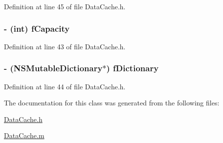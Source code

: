 Definition at line 45 of file DataCache.h.

\hypertarget{interface_data_cache_af27c42bd9600a5c9935ce169048c1f29}{
\subsubsection[{fCapacity}]{\setlength{\rightskip}{0pt plus 5cm}-\/ (int) {\bf fCapacity}}}
\label{interface_data_cache_af27c42bd9600a5c9935ce169048c1f29}


Definition at line 43 of file DataCache.h.

\hypertarget{interface_data_cache_a33188f8093fc0f16aa619a76d2963dca}{
\subsubsection[{fDictionary}]{\setlength{\rightskip}{0pt plus 5cm}-\/ (NSMutableDictionary$\ast$) {\bf fDictionary}}}
\label{interface_data_cache_a33188f8093fc0f16aa619a76d2963dca}


Definition at line 44 of file DataCache.h.



The documentation for this class was generated from the following files:\begin{DoxyCompactItemize}
\item 
\hyperlink{_data_cache_8h}{DataCache.h}\item 
\hyperlink{_data_cache_8m}{DataCache.m}\end{DoxyCompactItemize}

